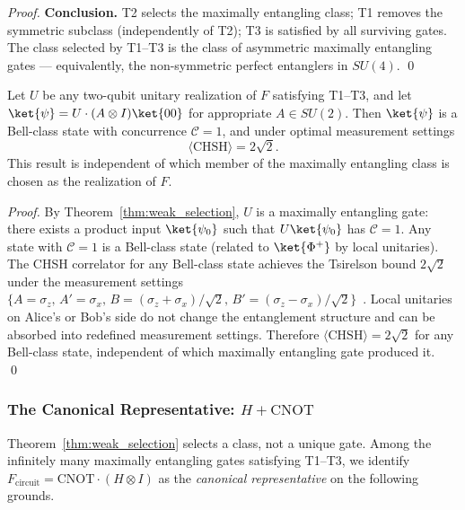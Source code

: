 \begin{proof}
\medskip
\noindent\textbf{Conclusion.}
T2 selects the maximally entangling class; T1 removes the symmetric
subclass (independently of T2); T3 is satisfied by all surviving
gates. The class selected by T1--T3 is the class of asymmetric
maximally entangling gates --- equivalently, the non-symmetric
perfect entanglers in $SU(4)$.
\qed
\end{proof}

\begin{corollary}
\label{cor:CHSH_class}
Let $U$ be any two-qubit unitary realization of $F$ satisfying T1--T3,
and let $\ket{\psi} = U\cdot(A\otimes I)\ket{00}$ for appropriate
$A \in SU(2)$. Then $\ket{\psi}$ is a Bell-class state with
concurrence $\mathcal{C} = 1$, and under optimal measurement settings
\begin{equation}
    \langle\mathrm{CHSH}\rangle = 2\sqrt{2}.
    \label{eq:CHSH_class}
\end{equation}
This result is independent of which member of the maximally entangling
class is chosen as the realization of $F$.
\end{corollary}

\begin{proof}
By Theorem~\ref{thm:weak_selection}, $U$ is a maximally entangling
gate: there exists a product input $\ket{\psi_0}$ such that
$U\ket{\psi_0}$ has $\mathcal{C} = 1$. Any state with $\mathcal{C}=1$
is a Bell-class state (related to $\ket{\Phi^+}$ by local unitaries).
The CHSH correlator for any Bell-class state achieves the Tsirelson
bound $2\sqrt{2}$ under the measurement settings
$\{A = \sigma_z,\, A' = \sigma_x,\, B = (\sigma_z+\sigma_x)/\sqrt{2},\,
B' = (\sigma_z-\sigma_x)/\sqrt{2}\}$~\cite{Cirelson1980}.
Local unitaries on Alice's or Bob's side do not change the
entanglement structure and can be absorbed into redefined
measurement settings. Therefore $\langle\mathrm{CHSH}\rangle = 2\sqrt{2}$
for any Bell-class state, independent of which maximally entangling
gate produced it. \qed
\end{proof}

\subsubsection*{The Canonical Representative: $H + \mathrm{CNOT}$}

Theorem~\ref{thm:weak_selection} selects a class, not a unique gate.
Among the infinitely many maximally entangling gates satisfying T1--T3,
we identify $F_{\mathrm{circuit}} = \mathrm{CNOT}\cdot(H\otimes I)$
as the \emph{canonical representative} on the following grounds.

